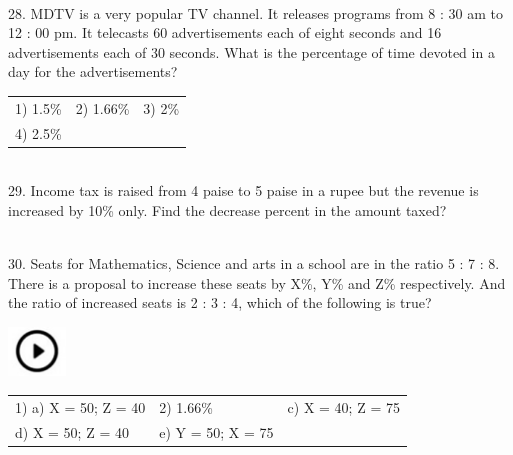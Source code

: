 \documentclass{article}
\begin{document}
\noindent 

\noindent 

\noindent \\
 28. MDTV is a very popular TV channel. It releases programs from 8 : 30 am to 12 : 00 pm. It telecasts 60 advertisements each of eight seconds and 16 advertisements each of 30 seconds. What is the percentage of time devoted in a day for the advertisements?


\begin{tabular}{p{1.7in} p{1.6in} p{1.6in}} \\ 
	 1) 1.5\%  &  2) 1.66\%     &  3) 2\%  \\
   4) 2.5\%   \\
\end{tabular}

                                     

\noindent 

\noindent 

\noindent \\
 29. Income tax is raised from 4 paise to 5 paise in a rupee but the revenue is increased by 10\% only. Find the decrease percent in the amount taxed?

\noindent 

\noindent 

\noindent \\
30. Seats for Mathematics, Science and arts in a school are in the ratio 5 : 7 : 8. There is a proposal to increase these seats by X\%, Y\% and Z\% respectively. And the ratio of increased seats is 2 : 3 : 4, which of the following is true?

\noindent   \includegraphics*[width=0.60in, height=0.52in]{images/image1}   
\begin{tabular}{p{1.7in} p{1.6in} p{1.6in}} \\ 
	1) a) X = 50; Z = 40  &  2) 1.66\%     &  c) X = 40; Z = 75    \\
	d) X = 50; Z = 40 &  e) Y = 50; X = 75 \\
\end{tabular}
                                                                               

\noindent 
\end{document}
